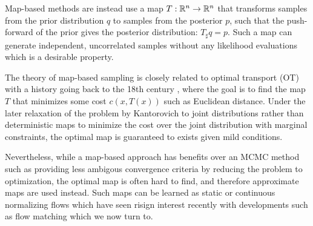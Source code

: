 Map-based methods \citep{marzoukSamplingMeasureTransport2016} are instead use a map $T:\mathbb{R}^n \to \mathbb{R}^n$ that transforms samples from the prior distribution $q$ to samples from the posterior $p$, such that the push-forward of the prior gives the posterior distribution: $T_\sharp  q = p$. Such a map can generate independent, uncorrelated samples without any likelihood evaluations which is a desirable property. 

The theory of map-based sampling is closely related to optimal transport (OT) \citep{peyreComputationalOptimalTransport2020,santambrogioOptimalTransportApplied2015} with a history going back to the 18th century \citep{mongeMemoireTheorieDeblais1781}, where the goal is to find the map $T$ that minimizes some cost $c(x, T(x))$ such as Euclidean distance. Under the later relaxation of the problem by Kantorovich \citep{kantorovitchTranslocationMasses1958} to joint distributions rather than deterministic maps to minimize the cost over the joint distribution with marginal constraints, the optimal map is guaranteed to exists given mild conditions. 
 
Nevertheless, while a map-based approach has benefits over an MCMC method such as providing less ambigous convergence criteria by reducing the problem to optimization, the optimal map is often hard to find, and therefore approximate maps are used instead. Such maps can be learned as static \citep{rezendeVariationalInferenceNormalizing2015} or continuous normalizing flows \citep{chenNeuralOrdinaryDifferential2018a} which have seen risign interest recently with developments such as flow matching which we now turn to. 

